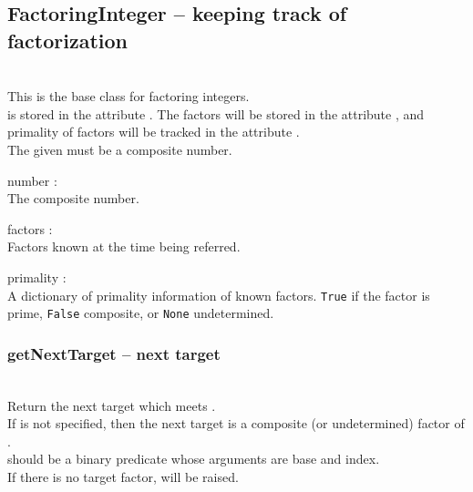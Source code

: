  \subsection{FactoringInteger -- keeping track of factorization}
 \initialize
  \\
  \spacing
  \quad This is the base class for factoring integers.\\
  \spacing
  \quad  {} is stored in the attribute . The factors will be stored in the attribute , and primality of factors will be tracked in the attribute .\\
  \spacing
  \quad The given  must be a composite number.\\
  \begin{at}
    \item[number]:\\ The composite number.
    \item[factors]:\\ Factors known at the time being referred.
    \item[primality]:\\ A dictionary of primality information of known factors.
      {\tt True} if the factor is prime, {\tt False} composite, or {\tt None} undetermined.
  \end{at}
  \method
  \subsubsection{getNextTarget -- next target}
   \\
   \spacing
   \quad Return the next target which meets .\\
   \spacing
   If  is not specified, then the next target is a composite (or undetermined) factor of .\\
   \spacing
   \quad {} should be a binary predicate whose arguments are base and index.\\
   \quad If there is no target factor,  will be raised.\\
%
